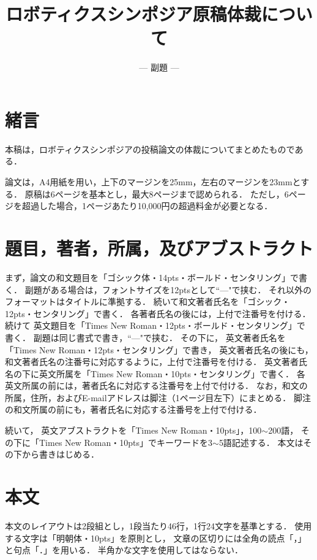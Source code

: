 \documentclass[a4jsme]{jsmepaper}
\title{
  ロボティクスシンポジア原稿体裁について
}
\subtitle{
  --- 副題 ---
}
\begin{document}
\maketitle
\thispagestyle{empty}
%
\section{緒言}
本稿は，ロボティクスシンポジアの投稿論文の体裁についてまとめたものである．

論文は，A4用紙を用い，上下のマージンを25mm，左右のマージンを23mmとする．
原稿は6ページを基本とし，最大8ページまで認められる．
ただし，6ページを超過した場合，1ページあたり10,000円の超過料金が必要となる．

\section{題目，著者，所属，及びアブストラクト}
まず，論文の和文題目を「ゴシック体・14pts・ボールド・センタリング」で書く．
副題がある場合は，フォントサイズを12ptsとして``---"で挟む．
それ以外のフォーマットはタイトルに準拠する．
続いて和文著者氏名を「ゴシック・12pts・センタリング」で書く．
各著者氏名の後には，上付で注番号を付ける．
続けて
英文題目を「Times New Roman・12pts・ボールド・センタリング」で書く．
副題は同じ書式で書き，``---"で挟む．
その下に，
英文著者氏名を「Times New Roman・12pts・センタリング」で書き，
英文著者氏名の後にも，和文著者氏名の注番号に対応するように，上付で注番号を付ける．
英文著者氏名の下に英文所属を「Times New Roman・10pts・センタリング」で書く．
各英文所属の前には，著者氏名に対応する注番号を上付で付ける．
なお，和文の所属，住所，およびE-mailアドレスは脚注（1ページ目左下）にまとめる．
脚注の和文所属の前にも，著者氏名に対応する注番号を上付で付ける．

続いて，
英文アブストラクトを「Times New Roman・10pts」，100$\sim$200語，
その下に「Times New Roman・10pts」でキーワードを3$\sim$5語記述する．
本文はその下から書きはじめる．

\section{本文}
本文のレイアウトは2段組とし，1段当たり46行，1行24文字を基準とする．
使用する文字は「明朝体・10pts」を原則とし，
文章の区切りには全角の読点「，」と句点「．」を用いる．
半角かな文字を使用してはならない．
\end{document}
